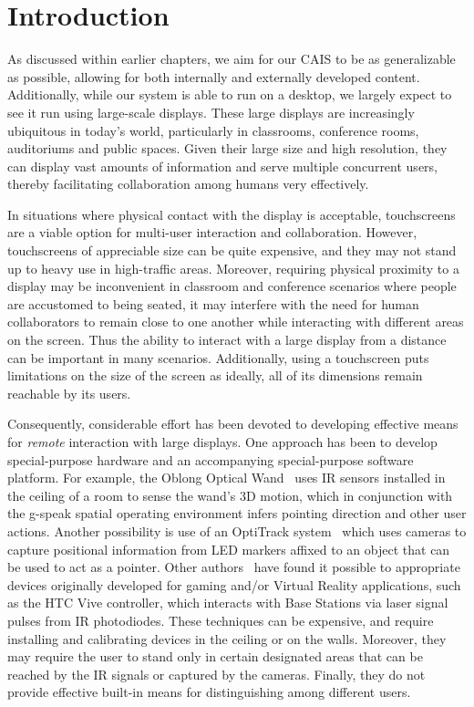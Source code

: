 \section{Introduction}\label{sec:03_introduction}

As discussed within earlier chapters, we aim for our CAIS to be as generalizable
as possible, allowing for both internally and externally developed content.
Additionally, while our system is able to run on a desktop, we largely expect
to see it run using large-scale displays. These large displays are increasingly
ubiquitous in today's world, particularly in classrooms, conference rooms, auditoriums
and public spaces. Given their large size and high resolution, they can display vast
amounts of information and serve multiple concurrent users, thereby facilitating
collaboration among humans very effectively.

In situations where physical contact with the display is acceptable, touchscreens are a viable option for multi-user interaction and collaboration. However, touchscreens of appreciable size can be quite expensive, and they may not stand up to heavy use in high-traffic areas. Moreover, requiring physical proximity to a display may be inconvenient in classroom and conference scenarios where people are accustomed to being seated, it may interfere with the need for human collaborators to remain close to one another while interacting with different areas on the screen. Thus the ability to interact with a large display from a distance can be important in many scenarios. Additionally, using a touchscreen puts limitations on the size of the screen as ideally, all of its dimensions remain reachable by its users.

Consequently, considerable effort has been devoted to developing effective means for {\em remote} interaction with large displays. One approach has been to develop special-purpose hardware and an accompanying special-purpose software platform. For example, the Oblong Optical Wand~\cite{oblong_industries_inc_oblong_2019} uses IR sensors installed in the ceiling of a room to sense the wand's 3D motion, which in conjunction with the g-speak spatial operating environment infers pointing direction and other user actions. Another possibility is use of an OptiTrack system~\cite{nagymate_application_1970,langner_multiple_2019} which uses cameras to capture positional information from LED markers affixed to an object that can be used to act as a pointer. Other authors~\cite{kephart_embodied_2019} have found it possible to appropriate devices originally developed for gaming and/or Virtual Reality applications, such as the HTC Vive controller, which interacts with Base Stations via laser signal pulses from IR photodiodes. These techniques can be expensive, and require installing and calibrating devices in the ceiling or on the walls. Moreover, they may require the user to stand only in certain designated areas that can be reached by the IR signals or captured by the cameras. Finally, they do not provide effective built-in means for distinguishing among different users.

